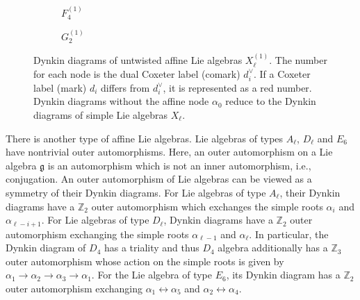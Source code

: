 \begin{figure}[t]
\begin{subfigure}[b]{0.5\textwidth}
		\caption{$ F_4^{(1)} $}
	\end{subfigure}
	\begin{subfigure}[b]{0.4\textwidth}
		\centering
		\caption{$ G_2^{(1)} $}
	\end{subfigure}
	\caption{Dynkin diagrams of untwisted affine Lie algebras $ X_\ell^{(1)} $. The number for each node is the dual Coxeter label (comark) $ d_i^\vee $. If a Coxeter label (mark) $ d_i $ differs from $ d_i^\vee $, it is represented as a red number. Dynkin diagrams without the affine node $ \alpha_0 $ reduce to the Dynkin diagrams of simple Lie algebras $ X_\ell $.} 
	\label{fig:dynkin_untwist}
\end{figure}

There is another type of affine Lie algebras. Lie algebras of types $ A_\ell $, $ D_\ell $ and $ E_6 $ have nontrivial outer automorphisms. Here, an outer automorphism on a Lie algebra $\mathfrak{g}$ is an automorphism which is not an inner automorphism, i.e., conjugation. An outer automorphism of Lie algebras can be viewed as a symmetry of their Dynkin diagrams. For Lie algebras of type $ A_\ell $, their Dynkin diagrams have a $ \mathbb{Z}_2 $ outer automorphism which exchanges the simple roots $ \alpha_i $ and $ \alpha_{\ell-i+1} $. For Lie algebras of type $ D_\ell $, Dynkin diagrams have a $ \mathbb{Z}_2 $ outer automorphism exchanging the simple roots $ \alpha_{\ell-1} $ and $ \alpha_{\ell} $. In particular, the Dynkin diagram of $ D_4 $ has a triality and thus $ D_4 $ algebra additionally has a $ \mathbb{Z}_3 $ outer automorphism whose action on the simple roots is given by $ \alpha_1 \to \alpha_2 \to \alpha_3 \to \alpha_1 $. For the Lie algebra of type $ E_6 $, its Dynkin diagram has a $ \mathbb{Z}_2 $ outer automorphism exchanging  $ \alpha_1 \leftrightarrow \alpha_5 $ and $ \alpha_2 \leftrightarrow \alpha_4 $.

